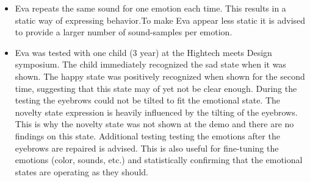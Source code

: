 \documentclass[project_eva.tex]{subfiles}
\begin{document}
\begin{itemize}
\item Eva repeats the same sound for one emotion each time. This results in a static way of expressing behavior.To make Eva appear less static it is advised to provide a larger number of sound-samples per emotion.
\item Eva was tested with one child (3 year) at the Hightech meets Design symposium. The child immediately recognized the sad state when it was shown. The happy state was positively recognized when shown for the second time, suggesting that this state may of yet not be clear enough.  During the testing the eyebrows could not be tilted to fit the emotional state. The novelty state expression is heavily influenced by the tilting of the eyebrows. This is why the novelty state was not shown at the demo and there are no findings on this state. Additional testing testing the emotions after the eyebrows are repaired is advised. This is also useful for fine-tuning the emotions (color, sounds, etc.) and statistically confirming that the emotional states are operating as they should.
\end{itemize}
\end{document}
